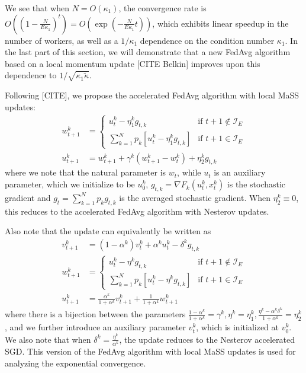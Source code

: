 We see that when $N=O(\kappa_{1})$, the convergence rate is $O((1-\frac{N}{E\kappa_{1}})^{t})=O(\exp(-\frac{N}{E\kappa_{1}}t))$,
which exhibits linear speedup in the number of workers, as well as
a $1/\kappa_{1}$ dependence on the condition number $\kappa_{1}$.
In the last part of this section, we will demonstrate that a new FedAvg
algorithm based on a local momentum update {[}CITE Belkin{]} improves
upon this dependence to $1/\sqrt{\kappa_{1}\tilde{\kappa}}$. 

Following {[}CITE{]}, we propose the accelerated FedAvg algorithm
with local MaSS updates: 
\begin{align*}
w_{t+1}^{k} & =\begin{cases}
u_{t}^{k}-\eta_{1}^{k}g_{t,k} & \text{if }t+1\notin\mathcal{I}_{E}\\
\sum_{k=1}^{N}p_{k}\left[u_{t}^{k}-\eta_{1}^{k}g_{t,k}\right] & \text{if }t+1\in\mathcal{I}_{E}
\end{cases}\\
u_{t+1}^{k} & =w_{t+1}^{k}+\gamma^{k}(w_{t+1}^{k}-w_{t}^{k})+\eta_{2}^{k}g_{t,k}
\end{align*}
where we note that the natural parameter is $w_{t}$, while $u_{t}$
is an auxiliary parameter, which we initialize to be $u_{0}^{k}$,
$g_{t,k}=\nabla F_{k}(u_{t}^{k},x_{t}^{k})$ is the stochastic gradient
and $g_{t}=\sum_{k=1}^{N}p_{k}g_{t,k}$ is the averaged stochastic
gradient. When $\eta_{2}^{k}\equiv0$, this reduces to the accelerated
FedAvg algorithm with Nesterov updates.

Also note that the update can equivalently be written as 
\begin{align*}
v_{t+1}^{k} & =(1-\alpha^{k})v_{t}^{k}+\alpha^{k}u_{t}^{k}-\delta^{k}g_{t,k}\\
w_{t+1}^{k} & =\begin{cases}
u_{t}^{k}-\eta^{k}g_{t,k} & \text{if }t+1\notin\mathcal{I}_{E}\\
\sum_{k=1}^{N}p_{k}\left[u_{t}^{k}-\eta^{k}g_{t,k}\right] & \text{if }t+1\in\mathcal{I}_{E}
\end{cases}\\
u_{t+1}^{k} & =\frac{\alpha^{k}}{1+\alpha^{k}}v_{t+1}^{k}+\frac{1}{1+\alpha^{k}}w_{t+1}^{k}
\end{align*}
where there is a bijection between the parameters $\frac{1-\alpha^{k}}{1+\alpha^{k}}=\gamma^{k},\eta^{k}=\eta_{1}^{k},\frac{\eta^{k}-\alpha^{k}\delta^{k}}{1+\alpha^{k}}=\eta_{2}^{k}$,
and we further introduce an auxiliary parameter $v_{t}^{k}$, which
is initialized at $v_{0}^{k}$. We also note that when $\delta^{k}=\frac{\eta^{k}}{\alpha^{k}}$,
the update reduces to the Nesterov accelerated SGD. This version of
the FedAvg algorithm with local MaSS updates is used for analyzing
the exponential convergence. 


